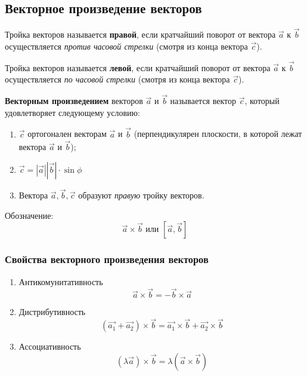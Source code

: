 \subsection{Векторное произведение векторов}

\begin{definition}
  Тройка векторов называется \textbf{правой}, если кратчайший поворот от вектора $\vec{a}$ к $\vec{b}$ осуществляется \textit{против часовой стрелки} (смотря из конца вектора $\vec{c}$).
\end{definition}

\begin{definition}
  Тройка векторов называется \textbf{левой}, если кратчайший поворот от вектора $\vec{a}$ к $\vec{b}$ осуществляется \textit{по часовой стрелки} (смотря из конца вектора $\vec{c}$).
\end{definition}

\begin{definition}
  \textbf{Векторным произведением} векторов $\vec{a}$ и $\vec{b}$ называется вектор $\vec{c}$, который удовлетворяет следующему условию:
  \begin{enumerate}
    \item $\vec{c}$ ортогонален векторам $\vec{a}$ и $\vec{b}$ (перпендикулярен плоскости, в которой лежат вектора $\vec{a}$ и $\vec{b}$);
    \item $\vec{c} = |\vec{a}| |\vec{b}| \cdot \sin \phi$
    \item Вектора $\vec{a}, \vec{b}, \vec{c}$ образуют \textit{правую} тройку векторов.
  \end{enumerate}
  Обозначение: \[
    \vec{a} \times \vec{b} \text{ или } [\vec{a}, \vec{b}]
  \] 
\end{definition}

\subsubsection{Свойства векторного произведения векторов}

\begin{enumerate}
  \item Антикомунитативность \[
    \vec{a} \times \vec{b} = - \vec{b} \times \vec{a}
  \] 
\item Дистрибутивность \[
    \left( \vec{a_1} + \vec{a_2} \right) \times \vec{b} = \vec{a_1} \times \vec{b} + \vec{a_2} \times  \vec{b} 
  \]  
  \item Ассоциативность \[
    \left( \lambda \vec{a} \right) \times \vec{b} = \lambda \left( \vec{a} \times \vec{b} \right)  
  \]
\end{enumerate}

